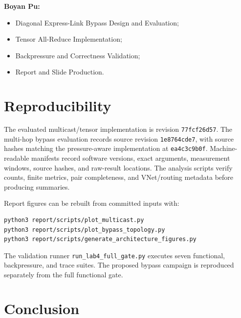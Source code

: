\documentclass[10pt]{article}
\begin{document}
\noindent\textbf{Boyan Pu:}
\begin{itemize}
  \item Diagonal Express-Link Bypass Design and Evaluation;
  \item Tensor All-Reduce Implementation;
  \item Backpressure and Correctness Validation;
  \item Report and Slide Production.
\end{itemize}

\section{Reproducibility}
\label{sec:reproducibility}

The evaluated multicast/tensor implementation is revision
\texttt{77fcf26d57}.  The multi-hop bypass evaluation records source revision
\texttt{1e8764cde7}, with source hashes matching the pressure-aware
implementation at \texttt{ea4c3c9b0f}.  Machine-readable manifests record
software versions, exact arguments, measurement windows, source hashes, and
raw-result locations.  The analysis scripts verify counts, finite metrics,
pair completeness, and VNet/routing metadata before producing summaries.

Report figures can be rebuilt from committed inputs with:

\begin{verbatim}
python3 report/scripts/plot_multicast.py
python3 report/scripts/plot_bypass_topology.py
python3 report/scripts/generate_architecture_figures.py
\end{verbatim}

The validation runner \texttt{run\_lab4\_full\_gate.py} executes seven
functional, backpressure, and trace suites.  The proposed bypass campaign is
reproduced separately from the full functional gate.

\section{Conclusion}
\end{document}
